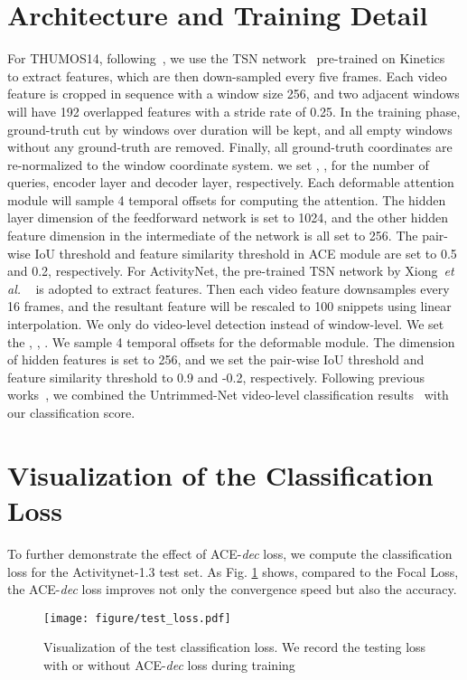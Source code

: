 \documentclass[runningheads]{llncs}
\def\etal{{\em et al. }}
\newcommand{\figref}[1]{Fig. \ref{#1}}
\def\cls{ACE }
\begin{document}
\section{Architecture and Training Detail}
For THUMOS14, following~\cite{xu2020g}, we use the TSN network~\cite{wang2018temporal} pre-trained on Kinetics~\cite{kay2017kinetics} to extract features, which are then down-sampled every five frames. 
Each video feature is cropped in sequence with a window size 256, and two adjacent windows will have 192 overlapped features with a stride rate of 0.25. In the training phase, ground-truth cut by windows over   duration will be kept, and all empty windows without any ground-truth are removed. Finally, all ground-truth coordinates are re-normalized to the window coordinate system. 
 we set , ,  for the number of queries, encoder layer and decoder layer, respectively. Each deformable attention module will sample 4 temporal offsets for computing the attention. The hidden layer dimension of the feedforward network is set to 1024, and the other hidden feature dimension in the intermediate of the network is all set to 256. The pair-wise IoU threshold  and feature similarity threshold  in \cls module are set to 0.5 and 0.2, respectively. 
For ActivityNet, the pre-trained TSN network by Xiong~\etal~\cite{xiong2016cuhk} is adopted to extract features. Then each video feature downsamples every 16 frames, and the resultant feature will be rescaled to 100 snippets using linear interpolation. 
We only do video-level detection instead of window-level. 
We set the , , . We sample 4 temporal offsets for the deformable module. 
The dimension of hidden features is set to 256, and we set the pair-wise IoU threshold  and feature similarity threshold  to 0.9 and -0.2, respectively. Following previous works~\cite{xu2020g,zeng2019graph,zhao2020bottom,yang2020revisiting}, we combined the Untrimmed-Net video-level classification results~\cite{wang2017untrimmednets} with our classification score.


\section{Visualization of the Classification Loss}
To further demonstrate the effect of ACE-\textit{dec} loss, we compute the classification loss for the Activitynet-1.3 test set. As \figref{loss} shows, compared to the Focal Loss, the ACE-\textit{dec} loss improves not only the convergence speed but also the accuracy.

\begin{figure}[]
    \centering
\texttt{[image: figure/test\_loss.pdf]}
  \caption{Visualization of the test classification loss. We record the testing loss with or without ACE-\textit{dec} loss during training}
  \label{loss}
\end{figure}








\end{document}
